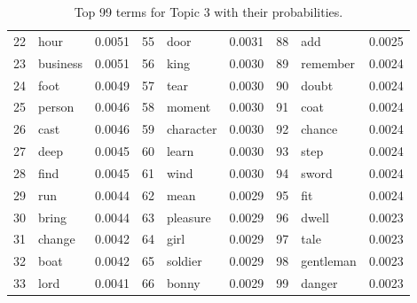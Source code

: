 \begin{table}[ht]
\begin{tabular}{rlrrlrrlr}
  22 & hour & 0.0051 & 55 & door & 0.0031 & 88 & add & 0.0025 \\ 
  23 & business & 0.0051 & 56 & king & 0.0030 & 89 & remember & 0.0024 \\ 
  24 & foot & 0.0049 & 57 & tear & 0.0030 & 90 & doubt & 0.0024 \\ 
  25 & person & 0.0046 & 58 & moment & 0.0030 & 91 & coat & 0.0024 \\ 
  26 & cast & 0.0046 & 59 & character & 0.0030 & 92 & chance & 0.0024 \\ 
  27 & deep & 0.0045 & 60 & learn & 0.0030 & 93 & step & 0.0024 \\ 
  28 & find & 0.0045 & 61 & wind & 0.0030 & 94 & sword & 0.0024 \\ 
  29 & run & 0.0044 & 62 & mean & 0.0029 & 95 & fit & 0.0024 \\ 
  30 & bring & 0.0044 & 63 & pleasure & 0.0029 & 96 & dwell & 0.0023 \\ 
  31 & change & 0.0042 & 64 & girl & 0.0029 & 97 & tale & 0.0023 \\ 
  32 & boat & 0.0042 & 65 & soldier & 0.0029 & 98 & gentleman & 0.0023 \\ 
  33 & lord & 0.0041 & 66 & bonny & 0.0029 & 99 & danger & 0.0023 \\ 
   \hline
\end{tabular}
\caption{\small{ Top 99 terms for Topic 3 with their probabilities.}} 
\label{topic_3_terms}
\end{table}
